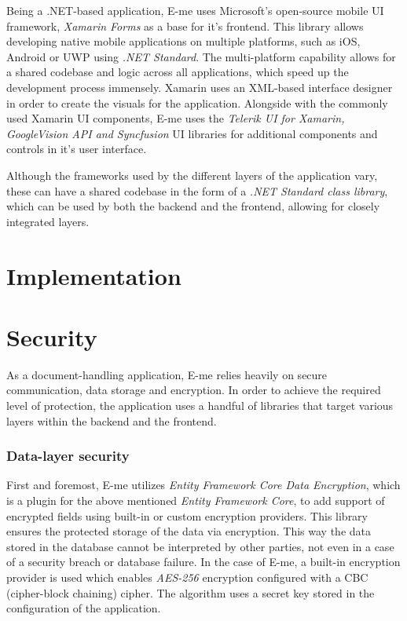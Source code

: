 Being a .NET-based application, E-me uses Microsoft's open-source mobile UI framework, \emph{Xamarin Forms} as a base for it's frontend.
This library allows developing native mobile applications on multiple platforms, such as iOS, Android or UWP using \emph{.NET Standard}. 
The multi-platform capability allows for a shared codebase and logic across all applications, which speed up the development process immensely.
Xamarin uses an XML-based interface designer in order to create the visuals for the application.
Alongside with the commonly used Xamarin UI components, E-me uses the \emph{Telerik UI for Xamarin, GoogleVision API and Syncfusion} UI
libraries for additional components and controls in it's user interface.



Although the frameworks used by the different layers of the application vary, these can have a shared codebase in the form
of a \emph{.NET Standard class library}, which can be used by both the backend and the frontend, allowing for closely integrated layers.

\section{Implementation}

\section{Security}

As a document-handling application, E-me relies heavily on secure communication, data storage and encryption.
In order to achieve the required level of protection, the application uses a handful of libraries that target various layers within the backend and the frontend.

\subsubsection{Data-layer security}

First and foremost, E-me utilizes \emph{Entity Framework Core Data Encryption}, which is a plugin for the above mentioned \emph{Entity Framework Core},
 to add support of encrypted fields using built-in or custom encryption providers.
This library ensures the protected storage of the data via encryption.
This way the data stored in the database cannot be interpreted by other parties, not even in a case of a security breach or database failure.
In the case of E-me, a built-in encryption provider is used which enables \emph{AES-256} encryption configured with a CBC (cipher-block chaining) cipher.
The algorithm uses a secret key stored in the configuration of the application.

